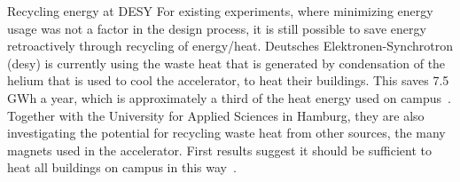 \documentclass[../SustainableHEP.tex]{subfiles}
\begin{document}
\begin{bestpractice}{Recycling energy at DESY}%
   For existing experiments, where minimizing energy usage was not a factor in the design process, it is still possible to save energy retroactively through recycling of energy/heat. Deutsches Elektronen-Synchrotron (\acrshort{desy}) is currently using the waste heat that is generated by condensation of the helium that is used to cool the accelerator, to heat their buildings. This saves 7.5 GWh a year, which is approximately a third of the heat energy used on campus~\cite{DESY}. Together with the University for Applied Sciences in Hamburg, they are also investigating the potential for recycling waste heat from other sources, \eg the many magnets used in the accelerator. First results suggest it should be sufficient to heat all buildings on campus in this way~\cite{DESYsustainableReport2022}.
\end{bestpractice}
\end{document}
